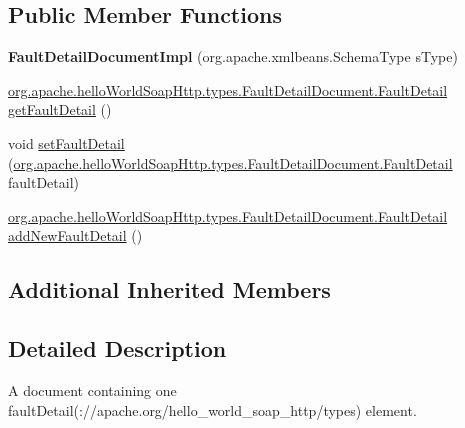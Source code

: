 \subsection*{Public Member Functions}
\begin{DoxyCompactItemize}
\item 
\hypertarget{classorg_1_1apache_1_1hello_world_soap_http_1_1types_1_1impl_1_1_fault_detail_document_impl_a68edb881c71931d4b2f4d3625c6abd7a}{}{\bfseries Fault\+Detail\+Document\+Impl} (org.\+apache.\+xmlbeans.\+Schema\+Type s\+Type)\label{classorg_1_1apache_1_1hello_world_soap_http_1_1types_1_1impl_1_1_fault_detail_document_impl_a68edb881c71931d4b2f4d3625c6abd7a}

\item 
\hyperlink{interfaceorg_1_1apache_1_1hello_world_soap_http_1_1types_1_1_fault_detail_document_1_1_fault_detail}{org.\+apache.\+hello\+World\+Soap\+Http.\+types.\+Fault\+Detail\+Document.\+Fault\+Detail} \hyperlink{classorg_1_1apache_1_1hello_world_soap_http_1_1types_1_1impl_1_1_fault_detail_document_impl_ac1f18e13f2c748492e1e95a1a749dedc}{get\+Fault\+Detail} ()
\item 
void \hyperlink{classorg_1_1apache_1_1hello_world_soap_http_1_1types_1_1impl_1_1_fault_detail_document_impl_a86eae94c9edc7cffcbb5cef5c8570cfc}{set\+Fault\+Detail} (\hyperlink{interfaceorg_1_1apache_1_1hello_world_soap_http_1_1types_1_1_fault_detail_document_1_1_fault_detail}{org.\+apache.\+hello\+World\+Soap\+Http.\+types.\+Fault\+Detail\+Document.\+Fault\+Detail} fault\+Detail)
\item 
\hyperlink{interfaceorg_1_1apache_1_1hello_world_soap_http_1_1types_1_1_fault_detail_document_1_1_fault_detail}{org.\+apache.\+hello\+World\+Soap\+Http.\+types.\+Fault\+Detail\+Document.\+Fault\+Detail} \hyperlink{classorg_1_1apache_1_1hello_world_soap_http_1_1types_1_1impl_1_1_fault_detail_document_impl_acd6bf6fe680774293eb7eef4b5aa003e}{add\+New\+Fault\+Detail} ()
\end{DoxyCompactItemize}
\subsection*{Additional Inherited Members}


\subsection{Detailed Description}
A document containing one fault\+Detail(\+://apache.org/hello\+\_\+world\+\_\+soap\+\_\+http/types) element.


